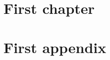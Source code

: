 \documentclass[a4paper, 14pt, extrafontsizes, oneside, openany, x11names]{memoir} %
\begin{document}

\frontmatter %
\clearpage %
\pagestyle{contents} %
\tableofcontents* %
\clearpage %

\mainmatter %
\chapter{First chapter}\label{chapter1} %

\newpage
\appendix
\chapter{First appendix}\label{appendix1} %

\backmatter %
\printbibliography[heading=bibintoc] %
\end{document}
